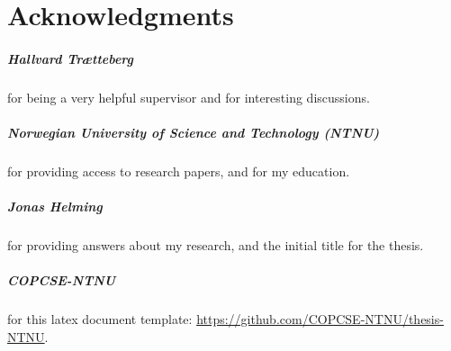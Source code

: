\chapter*{Acknowledgments}

\paragraph*{Hallvard Trætteberg} for being a very helpful supervisor
and for interesting discussions.

\paragraph*{Norwegian University of Science and Technology (NTNU)} for providing access to research papers, and for my education. 

\paragraph*{Jonas Helming} for providing answers about my research, and the initial title for the thesis.


\paragraph*{COPCSE-NTNU} for this latex document template: \href{https://github.com/COPCSE-NTNU/thesis-NTNU}{https://github.com/COPCSE-NTNU/thesis-NTNU}.



